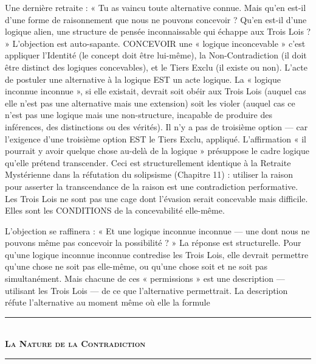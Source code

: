 \documentclass[10pt, openany, oneside]{book}
\renewcommand{\normalsize}{\fontsize{10}{13}\selectfont}
\begin{document}
Une dernière retraite : « Tu as vaincu toute alternative connue. Mais qu'en est-il d'une forme de raisonnement que nous ne pouvons concevoir ? Qu'en est-il d'une logique alien, une structure de pensée inconnaissable qui échappe aux Trois Lois ? » L'objection est auto-sapante. CONCEVOIR une « logique inconcevable » c'est appliquer l'Identité (le concept doit être lui-même), la Non-Contradiction (il doit être distinct des logiques concevables), et le Tiers Exclu (il existe ou non). L'acte de postuler une alternative à la logique EST un acte logique. La « logique inconnue inconnue », si elle existait, devrait soit obéir aux Trois Lois (auquel cas elle n'est pas une alternative mais une extension) soit les violer (auquel cas ce n'est pas une logique mais une non-structure, incapable de produire des inférences, des distinctions ou des vérités). Il n'y a pas de troisième option --- car l'exigence d'une troisième option EST le Tiers Exclu, appliqué. L'affirmation « il pourrait y avoir quelque chose au-delà de la logique » présuppose le cadre logique qu'elle prétend transcender. Ceci est structurellement identique à la Retraite Mystérienne dans la réfutation du solipsisme (Chapitre 11) : utiliser la raison pour asserter la transcendance de la raison est une contradiction performative. Les Trois Lois ne sont pas une cage dont l'évasion serait concevable mais difficile. Elles sont les CONDITIONS de la concevabilité elle-même.

L'objection se raffinera : « Et une logique inconnue inconnue --- une dont nous ne pouvons même pas concevoir la possibilité ? » La réponse est structurelle. Pour qu'une logique inconnue inconnue contredise les Trois Lois, elle devrait permettre qu'une chose ne soit pas elle-même, ou qu'une chose soit et ne soit pas simultanément. Mais chacune de ces « permissions » est une description --- utilisant les Trois Lois --- de ce que l'alternative permettrait. La description réfute l'alternative au moment même où elle la formule

\vspace{1.5em}


\begin{center}
    \rule{0.3\textwidth}{0.4pt}\\[0.5em]
    {\normalsize\bfseries\scshape La Nature de la Contradiction}\\[0.3em]
    \rule{0.3\textwidth}{0.4pt}
\end{center}
\end{document}
